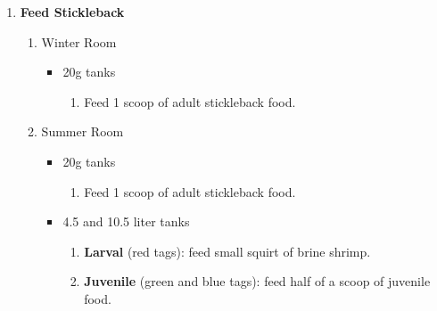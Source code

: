 \documentclass[
  letterpaper,
  DIV=11,
  numbers=noendperiod]{scrreprt}
\providecommand{\tightlist}{%
  \setlength{\itemsep}{0pt}\setlength{\parskip}{0pt}}\usepackage{longtable,booktabs,array}
\begin{document}
\begin{enumerate}
\def\labelenumi{\arabic{enumi}.}
\setcounter{enumi}{2}
\item
  \textbf{Feed Stickleback}

  \begin{enumerate}
  \def\labelenumii{\arabic{enumii}.}
  \tightlist
  \item
    Winter Room

    \begin{itemize}
    \tightlist
    \item
      20g tanks

      \begin{enumerate}
      \def\labelenumiii{\arabic{enumiii}.}
      \tightlist
      \item
        Feed 1 scoop of adult stickleback food.
      \end{enumerate}
    \end{itemize}
  \item
    Summer Room

    \begin{itemize}
    \tightlist
    \item
      20g tanks

      \begin{enumerate}
      \def\labelenumiii{\arabic{enumiii}.}
      \tightlist
      \item
        Feed 1 scoop of adult stickleback food.
      \end{enumerate}
    \item
      4.5 and 10.5 liter tanks

      \begin{enumerate}
      \def\labelenumiii{\arabic{enumiii}.}
      \tightlist
      \item
        \textbf{Larval} (red tags): feed small squirt of brine shrimp.
      \item
        \textbf{Juvenile} (green and blue tags): feed half of a scoop of
        juvenile food.
      \end{enumerate}
    \end{itemize}
  \end{enumerate}

  \begin{tcolorbox}[enhanced jigsaw, rightrule=.15mm, title=\textcolor{quarto-callout-warning-color}{\faExclamationTriangle}\hspace{0.5em}{NOTES}, titlerule=0mm, opacitybacktitle=0.6, toprule=.15mm, bottomrule=.15mm, opacityback=0, left=2mm, colframe=quarto-callout-warning-color-frame, breakable, coltitle=black, colback=white, colbacktitle=quarto-callout-warning-color!10!white, bottomtitle=1mm, leftrule=.75mm, toptitle=1mm, arc=.35mm]


\end{tcolorbox}
\end{enumerate}
\end{document}
